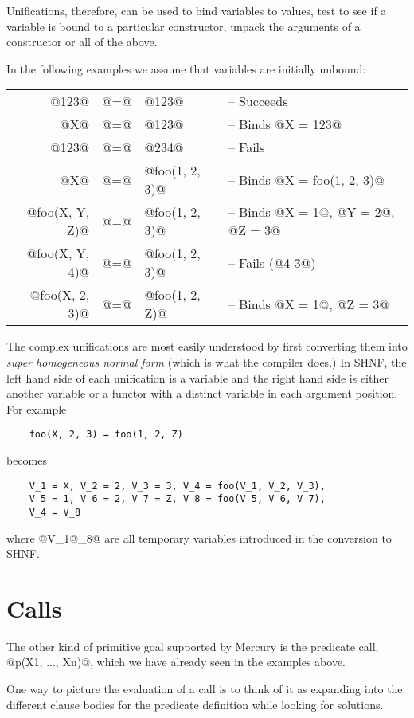 Unifications, therefore, can be used to bind variables to
values, test to see if a variable is bound to a particular
constructor, unpack the arguments of a constructor or all of
the above.

In the following examples we assume that variables are
initially unbound:

\begin{tabular}{rcll}
         @123@ & @=@ & @123@ &
                -- Succeeds \\
           @X@ & @=@ & @123@ &
                -- Binds @X = 123@ \\
         @123@ & @=@ & @234@ &
                -- Fails \\
           @X@ & @=@ & @foo(1, 2, 3)@ &
                -- Binds @X = foo(1, 2, 3)@ \\
@foo(X, Y, Z)@ & @=@ & @foo(1, 2, 3)@ &
                -- Binds @X = 1@, @Y = 2@, @Z = 3@ \\
@foo(X, Y, 4)@ & @=@ & @foo(1, 2, 3)@ &
                -- Fails (@4 \= 3@) \\
@foo(X, 2, 3)@ & @=@ & @foo(1, 2, Z)@ &
                -- Binds @X = 1@, @Z = 3@ \\
\end{tabular}

The complex unifications are most easily understood by first
converting them into \emph{super homogeneous normal form} (which is
what the compiler does.)  In SHNF, the left hand side of each
unification is a variable and the right hand side is either
another variable or a functor with a distinct variable in each argument
position.
For example

\begin{verbatim}
    foo(X, 2, 3) = foo(1, 2, Z)
\end{verbatim}
becomes
\begin{verbatim}
    V_1 = X, V_2 = 2, V_3 = 3, V_4 = foo(V_1, V_2, V_3),
    V_5 = 1, V_6 = 2, V_7 = Z, V_8 = foo(V_5, V_6, V_7),
    V_4 = V_8
\end{verbatim}
where @V_1@\ldots@V_8@ are all temporary variables
introduced in the conversion to SHNF.

\section{Calls}
The other kind of primitive goal supported by Mercury is the
predicate call, @p(X1, ..., Xn)@, which we have already seen in
the examples above.

One way to picture the evaluation of a call is to think of it
as expanding into the different clause bodies for the
predicate definition while looking for solutions.

